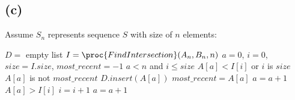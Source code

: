     \begin{spacing}{1.5}
    \subsection{(c)}
        Assume $S_n$ represents sequence $S$ with size of $n$ elements:
        \begin{codebox}
            \li $D =$ empty list
            \li $I = \proc{FindIntersection}(A_n, B_n, n)$
            \li $a = 0$, $i = 0$, $size=I.size$, $most\_recent = -1$
            \li \While $a < n$ and $i \leq size$
                \Do
                    \li \If $A[a]<I[i]$ or $i$ is $size$
                    \Then
                        \li \If $A[a]$ is not $most\_recent$
                        \Then
                            \li $D.insert(A[a])$
                            \li $most\_recent = A[a]$
                        \End
                        \li $a = a + 1$
                    \li \ElseIf $A[a]>I[i]$
                    \Then
                        \li $i = i + 1$
                    \li \ElseNoIf
                        \li $a = a + 1$
                    \End 
                \End
        \end{codebox}
    \end{spacing}